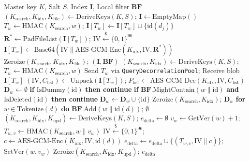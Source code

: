 \documentclass[10pt,conference]{IEEEtran}
\begin{document}
\begin{algorithm}[t]
\caption{VisioCrypt Core Operational Protocols}
\label{alg:protocols}
\scriptsize
\begin{algorithmic}[1]
\Require Master key $K$, Salt $S$, Index $\mathbf{I}$, Local filter $\mathbf{BF}$
    \State $(K_{\text{search}}, K_{\text{idx}}, K_{\text{file}}) \gets \text{DeriveKeys}(K, S)$; $\mathbf{I} \gets \text{EmptyMap}()$
        \State $T_w \gets \text{HMAC}(K_{\text{search}}, w)$; $\mathbf{I}[T_w] \gets \mathbf{I}[T_w] \cup \{\text{id}(d_j)\}$
    \EndFor
        \State $\mathbf{R}^* \gets \text{PadFileList}(\mathbf{I}[T_w])$; $\text{IV} \xleftarrow{\$} \{0,1\}^{96}$
        \State $\mathbf{I}[T_w] \gets \text{Base64}(\text{IV} \parallel \text{AES-GCM-Enc}(K_{\text{idx}}, \text{IV}, \mathbf{R}^*))$
    \EndFor
    \State $\text{Zeroize}(K_{\text{search}}, K_{\text{idx}}, K_{\text{file}})$; \Return $(\mathbf{I}, \mathbf{BF})$
\EndProcedure
{}
    \State $(K_{\text{search}}, K_{\text{idx}}) \gets \text{DeriveKeys}(K, S)$; $T_w \gets \text{HMAC}(K_{\text{search}}, w)$
    \State Send $T_w$ via \texttt{QueryDecorrelationPool}; Receive blob $\mathbf{I}[T_w]$
    \State $(\text{IV}, C_{\text{list}}) \gets \text{Unpack}(\mathbf{I}[T_w])$; $P_{\text{list}} \gets \text{AES-GCM-Dec}(K_{\text{idx}}, \text{IV}, C_{\text{list}})$
    \State $\mathbf{D}_w \gets \emptyset$
        \State \textbf{if} $\text{IsDummy}(\text{id})$ \textbf{then continue}
        \State \textbf{if} $\mathbf{BF}.\text{MightContain}(w \parallel \text{id})$ \textbf{and} $\text{IsDeleted}(\text{id})$ \textbf{then continue}
        \State $\mathbf{D}_w \gets \mathbf{D}_w \cup \{\text{id}\}$
    \EndFor
    \State $\text{Zeroize}(K_{\text{search}}, K_{\text{idx}})$; \Return $\mathbf{D}_w$
\EndProcedure
{}
        \State \textbf{for} $w \in \text{Tokenize}(d)$ \textbf{do} $\mathbf{BF}.\text{Add}(w \parallel \text{id}(d))$; \Return $\emptyset$
    \EndIf
    \State $(K_{\text{search}}, K_{\text{idx}}, K_{\text{upd}}) \gets \text{DeriveKeys}(K, S)$; $e_{\text{delta}} \gets \emptyset$
        \State $v_w \gets \text{GetVer}(w) + 1$; $T_{w,v} \gets \text{HMAC}(K_{\text{search}}, w \parallel v_w)$
        \State $\text{IV} \xleftarrow{\$} \{0,1\}^{96}$; $c \gets \text{AES-GCM-Enc}(K_{\text{idx}}, \text{IV}, \text{id}(d))$
        \State $e_{\text{delta}} \gets e_{\text{delta}} \cup \{(T_{w,v}, \text{IV} \parallel c)\}$; $\text{SetVer}(w, v_w)$
    \EndFor
    \State $\text{Zeroize}(K_{\text{search}}, K_{\text{idx}}, K_{\text{upd}})$; \Return $e_{\text{delta}}$
\EndProcedure
\end{algorithmic}
\end{algorithm}
\end{document}
